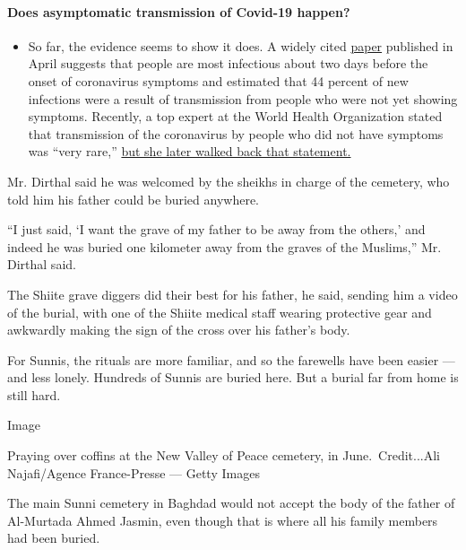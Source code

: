 \begin{itemize}
{  \paragraph{Does asymptomatic transmission of Covid-19
  happen?}\label{does-asymptomatic-transmission-of-covid-19-happen}}

  \begin{itemize}
  \tightlist
  \item
    So far, the evidence seems to show it does. A widely cited
    \href{https://www.nature.com/articles/s41591-020-0869-5}{paper}
    published in April suggests that people are most infectious about
    two days before the onset of coronavirus symptoms and estimated that
    44 percent of new infections were a result of transmission from
    people who were not yet showing symptoms. Recently, a top expert at
    the World Health Organization stated that transmission of the
    coronavirus by people who did not have symptoms was ``very rare,''
    \href{https://www.nytimes3xbfgragh.onion/2020/06/09/world/coronavirus-updates.html?action=click\&pgtype=Article\&state=default\&region=MAIN_CONTENT_3\&context=storylines_faq\#link-1f302e21}{but
    she later walked back that statement.}
  \end{itemize}
\end{itemize}

Mr. Dirthal said he was welcomed by the sheikhs in charge of the
cemetery, who told him his father could be buried anywhere.

``I just said, `I want the grave of my father to be away from the
others,' and indeed he was buried one kilometer away from the graves of
the Muslims,'' Mr. Dirthal said.

The Shiite grave diggers did their best for his father, he said, sending
him a video of the burial, with one of the Shiite medical staff wearing
protective gear and awkwardly making the sign of the cross over his
father's body.

For Sunnis, the rituals are more familiar, and so the farewells have
been easier --- and less lonely. Hundreds of Sunnis are buried here. But
a burial far from home is still hard.

Image

Praying over coffins at the New Valley of Peace cemetery, in
June.~Credit...Ali Najafi/Agence France-Presse --- Getty Images

The main Sunni cemetery in Baghdad would not accept the body of the
father of Al-Murtada Ahmed Jasmin, even though that is where all his
family members had been buried.

